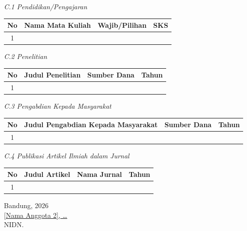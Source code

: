 \textit{C.1 Pendidikan/Pengajaran}
\begin{table}[h]
    \begin{tabularx}{\textwidth}{|c|X|X|c|}
        \hline
        \textbf{No} & \textbf{Nama Mata Kuliah} & \textbf{Wajib/Pilihan} & \textbf{SKS} \\ \hline
        1 & & & \\ \hline
    \end{tabularx}
\end{table}

\textit{C.2 Penelitian}
\begin{table}[h]
    \begin{tabularx}{\textwidth}{|c|X|X|c|}
        \hline
        \textbf{No} & \textbf{Judul Penelitian} & \textbf{Sumber Dana} & \textbf{Tahun} \\ \hline
        1 & & & \\ \hline
    \end{tabularx}
\end{table}

\textit{C.3 Pengabdian Kepada Masyarakat}
\begin{table}[h]
    \begin{tabularx}{\textwidth}{|c|X|X|c|}
        \hline
        \textbf{No} & \textbf{Judul Pengabdian Kepada Masyarakat} & \textbf{Sumber Dana} & \textbf{Tahun} \\ \hline
        1 & & & \\ \hline
    \end{tabularx}
\end{table}

\textit{C.4 Publikasi Artikel Ilmiah dalam Jurnal}
\begin{table}[h]
    \begin{tabularx}{\textwidth}{|c|X|X|c|}
        \hline
        \textbf{No} & \textbf{Judul Artikel} & \textbf{Nama Jurnal} & \textbf{Tahun} \\ \hline
        1 & & & \\ \hline
    \end{tabularx}
\end{table}

\vspace{1cm}
\begin{flushright}
    Bandung, \hspace{2cm} 2026\\[1cm]
    \underline{{[Nama Anggota 2]}, \ldots}\\
    NIDN.
\end{flushright}
